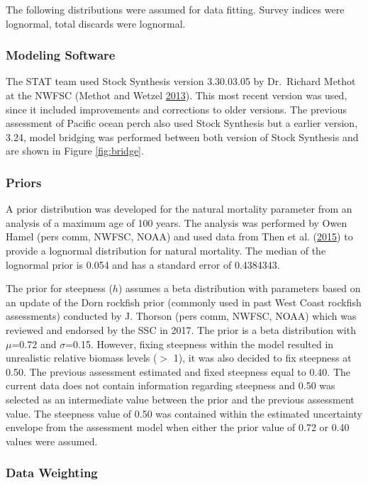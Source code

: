 \documentclass[12pt,]{article}
\begin{document}
The following distributions were assumed for data fitting. Survey
indices were lognormal, total discards were lognormal.

\subsubsection{Modeling Software}\label{modeling-software}

The STAT team used Stock Synthesis version 3.30.03.05 by Dr.~Richard
Methot at the NWFSC (Methot and Wetzel
\protect\hyperlink{ref-methot_stock_2013}{2013}). This most recent
version was used, since it included improvements and corrections to
older versions. The previous assessment of Pacific ocean perch also used
Stock Synthesis but a earlier version, 3.24, model bridging was
performed between both version of Stock Synthesis and are shown in
Figure \ref{fig:bridge}.

\subsubsection{Priors}\label{priors}

A prior distribution was developed for the natural mortality parameter
from an analysis of a maximum age of 100 years. The analysis was
performed by Owen Hamel (pers comm, NWFSC, NOAA) and used data from Then
et al. (\protect\hyperlink{ref-then_evaluating_2015}{2015}) to provide a
lognormal distribution for natural mortality. The median of the
lognormal prior is 0.054 and has a standard error of 0.4384343.

The prior for steepness (\(h\)) assumes a beta distribution with
parameters based on an update of the Dorn rockfish prior (commonly used
in past West Coast rockfish assessments) conducted by J. Thorson (pers
comm, NWFSC, NOAA) which was reviewed and endorsed by the SSC in 2017.
The prior is a beta distribution with \(\mu\)=0.72 and \(\sigma\)=0.15.
However, fixing steepness within the model resulted in unrealistic
relative biomass levels (\(>\) 1), it was also decided to fix steepness
at 0.50. The previous assessment estimated and fixed steepness equal to
0.40. The current data does not contain information regarding steepness
and 0.50 was selected as an intermediate value between the prior and the
previous assessment value. The steepness value of 0.50 was contained
within the estimated uncertainty envelope from the assessment model when
either the prior value of 0.72 or 0.40 values were assumed.

\subsubsection{Data Weighting}\label{data-weighting}
\end{document}
